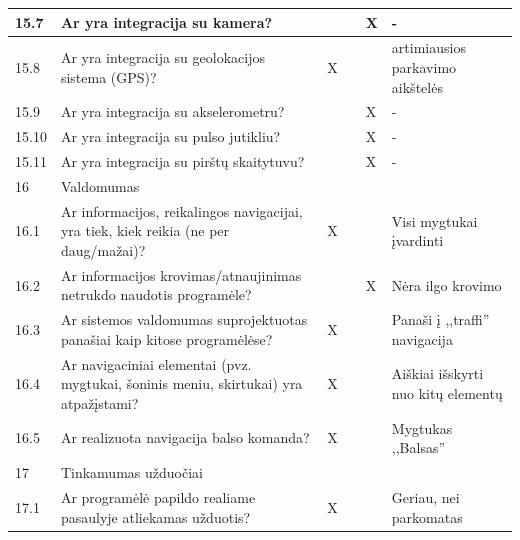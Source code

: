 \documentclass{VUMIFPSkursinis}
\begin{document}
\begin{longtable}[c]{|p{1cm}|p{4cm}|p{1cm}|p{1cm}|p{1.6cm}|p{4cm}|}
15.7  & Ar yra integracija su kamera?                                                                        &     &     &     X     &   -         \\ \hline
15.8  & Ar yra integracija su geolokacijos sistema (GPS)?                                                    &  X  &     &           &   artimiausios parkavimo aikštelės          \\ \hline
15.9  & Ar yra integracija su akselerometru?                                                                 &     &     &     X     &   -         \\ \hline
15.10 & Ar yra integracija su pulso jutikliu?                                                                &     &     &     X     &   -         \\ \hline
15.11 & Ar yra integracija su pirštų skaitytuvu?                                                             &     &     &     X     &   -         \\ \hline
16    & \multicolumn{5}{l|}{Valdomumas}                                                                                                            \\ \hline
16.1  & Ar informacijos, reikalingos navigacijai, yra tiek, kiek reikia (ne per daug/mažai)?                 &  X  &     &           &   Visi mygtukai įvardinti          \\ \hline
16.2  & Ar informacijos krovimas/atnaujinimas netrukdo naudotis programėle?                                  &     &     &     X     &   Nėra ilgo krovimo         \\ \hline
16.3  & Ar sistemos valdomumas suprojektuotas  panašiai kaip kitose programėlėse?                            &  X  &     &           &   Panaši į ,,traffi'' navigacija          \\ \hline
16.4  & Ar navigaciniai elementai (pvz. mygtukai, šoninis meniu, skirtukai) yra atpažįstami?                 &  X  &     &           &   Aiškiai išskyrti nuo kitų elementų          \\ \hline
16.5  & Ar realizuota navigacija balso komanda?                                                              &  X  &     &           &   Mygtukas ,,Balsas''          \\ \hline
17    & \multicolumn{5}{l|}{Tinkamumas užduočiai}                                                                                                  \\ \hline
17.1  & Ar programėlė papildo realiame pasaulyje atliekamas užduotis?                                        &  X  &     &           &   Geriau, nei parkomatas          \\ \hline

\end{longtable}
\end{document}
